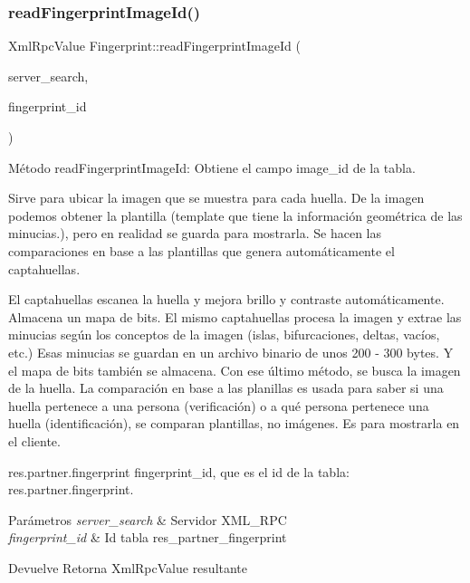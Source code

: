 \hypertarget{classFingerprint_a0aec9bd56a3983b0f5662c82258c32e2}{}\label{classFingerprint_a0aec9bd56a3983b0f5662c82258c32e2} 
\subsubsection{\texorpdfstring{read\+Fingerprint\+Image\+Id()}{readFingerprintImageId()}}
{\footnotesize\ttfamily Xml\+Rpc\+Value Fingerprint\+::read\+Fingerprint\+Image\+Id (\begin{DoxyParamCaption}\item[{Xml\+Rpc\+Client}]{server\+\_\+search,  }\item[{Xml\+Rpc\+Value}]{fingerprint\+\_\+id }\end{DoxyParamCaption})\hspace{0.3cm}{\ttfamily [inline]}}



Método read\+Fingerprint\+Image\+Id\+: Obtiene el campo image\+\_\+id de la tabla. 

Sirve para ubicar la imagen que se muestra para cada huella. De la imagen podemos obtener la plantilla (template que tiene la información geométrica de las minucias.), pero en realidad se guarda para mostrarla. Se hacen las comparaciones en base a las plantillas que genera automáticamente el captahuellas.

El captahuellas escanea la huella y mejora brillo y contraste automáticamente. Almacena un mapa de bits. El mismo captahuellas procesa la imagen y extrae las minucias según los conceptos de la imagen (islas, bifurcaciones, deltas, vacíos, etc.) Esas minucias se guardan en un archivo binario de unos 200 -\/ 300 bytes. Y el mapa de bits también se almacena. Con ese último método, se busca la imagen de la huella. La comparación en base a las planillas es usada para saber si una huella pertenece a una persona (verificación) o a qué persona pertenece una huella (identificación), se comparan plantillas, no imágenes. Es para mostrarla en el cliente.

res.\+partner.\+fingerprint fingerprint\+\_\+id, que es el id de la tabla\+: res.\+partner.\+fingerprint. 
\begin{DoxyParams}{Parámetros}
{\em server\+\_\+search} & Servidor X\+M\+L\+\_\+\+R\+PC \\
\hline
{\em fingerprint\+\_\+id} & Id tabla res\+\_\+partner\+\_\+fingerprint \\
\hline
\end{DoxyParams}
\begin{DoxyReturn}{Devuelve}
Retorna Xml\+Rpc\+Value resultante 
\end{DoxyReturn}


